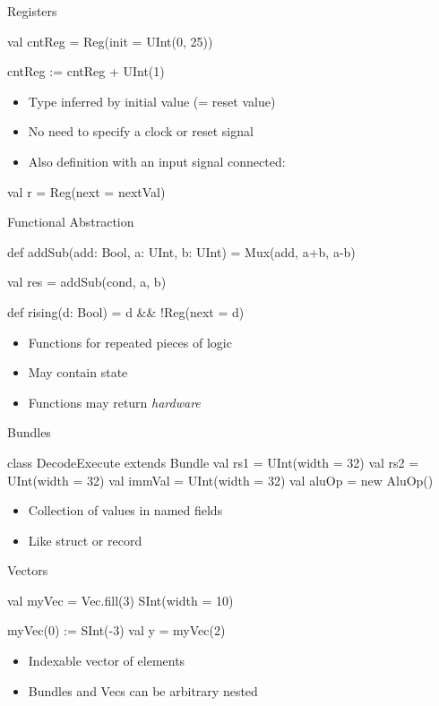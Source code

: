 \documentclass[xcolor=pdflatex,dvipsnames,table]{beamer}
\begin{document}
\begin{frame}[fragile]{Registers}
\begin{chisel}
val cntReg = Reg(init = UInt(0, 25))

cntReg := cntReg + UInt(1)
\end{chisel}
\begin{itemize}
\item Type inferred by initial value (= reset value)
\item No need to specify a clock or reset signal
\end{itemize}
\begin{itemize}
\item Also definition with an input signal connected:
\end{itemize}
\begin{chisel}
val r = Reg(next = nextVal) 
\end{chisel}
\end{frame}

\begin{frame}[fragile]{Functional Abstraction}
\begin{chisel}
  def addSub(add: Bool, a: UInt, b: UInt) =
    Mux(add, a+b, a-b)

  val res = addSub(cond, a, b)
  
  def rising(d: Bool) = d && !Reg(next = d)
\end{chisel}
\begin{itemize}
\item Functions for repeated pieces of logic
\item May contain state
\item Functions may return \emph{hardware}
\end{itemize}
\end{frame}


\begin{frame}[fragile]{Bundles}
\begin{chisel}
class DecodeExecute extends Bundle {
  val rs1 = UInt(width = 32)
  val rs2 = UInt(width = 32)
  val immVal = UInt(width = 32)
  val aluOp = new AluOp()
}
\end{chisel}
\begin{itemize}
\item Collection of values in named fields 
\item Like struct or record
\end{itemize}
\end{frame}

\begin{frame}[fragile]{Vectors}
\begin{chisel}
val myVec = Vec.fill(3){ SInt(width = 10) }

myVec(0) := SInt(-3)
val y = myVec(2)
\end{chisel}
\begin{itemize}
\item Indexable vector of elements
\item Bundles and Vecs can be arbitrary nested
\end{itemize}
\end{frame}
\end{document}
